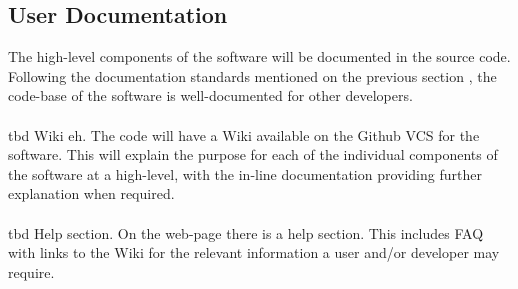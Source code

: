 \documentclass{article}
\newcommand{\comment}[1]{}
\begin{document}
\subsection{User Documentation}\label{userDocumentation}
\comment{
List the user documentation components (such as user manuals, on-line help, and tutorials) that will be delivered along with the software. Identify any known user documentation delivery formats or standards.
	}
The high-level components of the software will be documented in the source code. Following the documentation standards mentioned on the previous section , the code-base of the software is well-documented for other developers.
\\ \\ 
\acrshort{tbd} Wiki eh. The code will have a Wiki available on the Github VCS for the software. This will explain the purpose for each of the individual components of the software at a high-level, with the in-line documentation providing further explanation when required.
\\ \\ 
\acrshort{tbd} Help section. On the web-page there is a help section. This includes FAQ with links to the Wiki for the relevant information a user and/or developer may require.
\end{document}
